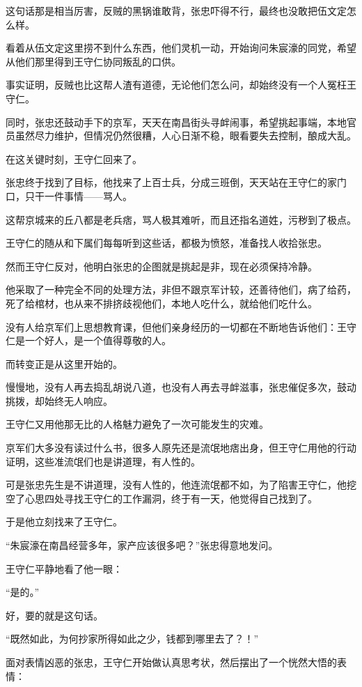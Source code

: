 \begin{multicols}{\theparacolNo}
这句话那是相当厉害，反贼的黑锅谁敢背，张忠吓得不行，最终也没敢把伍文定怎么样。

看着从伍文定这里捞不到什么东西，他们灵机一动，开始询问朱宸濠的同党，希望从他们那里得到王守仁协同叛乱的口供。

事实证明，反贼也比这帮人渣有道德，无论他们怎么问，却始终没有一个人冤枉王守仁。

同时，张忠还鼓动手下的京军，天天在南昌街头寻衅闹事，希望挑起事端，本地官员虽然尽力维护，但情况仍然很糟，人心日渐不稳，眼看要失去控制，酿成大乱。

在这关键时刻，王守仁回来了。

张忠终于找到了目标，他找来了上百士兵，分成三班倒，天天站在王守仁的家门口，只干一件事情——骂人。

这帮京城来的丘八都是老兵痞，骂人极其难听，而且还指名道姓，污秽到了极点。

王守仁的随从和下属们每每听到这些话，都极为愤怒，准备找人收拾张忠。

然而王守仁反对，他明白张忠的企图就是挑起是非，现在必须保持冷静。

他采取了一种完全不同的处理方法，非但不跟京军计较，还善待他们，病了给药，死了给棺材，也从来不排挤歧视他们，本地人吃什么，就给他们吃什么。

没有人给京军们上思想教育课，但他们亲身经历的一切都在不断地告诉他们：王守仁是一个好人，是一个值得尊敬的人。

而转变正是从这里开始的。

慢慢地，没有人再去捣乱胡说八道，也没有人再去寻衅滋事，张忠催促多次，鼓动挑拨，却始终无人响应。

王守仁又用他那无比的人格魅力避免了一次可能发生的灾难。

京军们大多没有读过什么书，很多人原先还是流氓地痞出身，但王守仁用他的行动证明，这些准流氓们也是讲道理，有人性的。

可是张忠先生是不讲道理，没有人性的，他连流氓都不如，为了陷害王守仁，他挖空了心思四处寻找王守仁的工作漏洞，终于有一天，他觉得自己找到了。

于是他立刻找来了王守仁。

“朱宸濠在南昌经营多年，家产应该很多吧？”张忠得意地发问。

王守仁平静地看了他一眼：

“是的。”

好，要的就是这句话。

“既然如此，为何抄家所得如此之少，钱都到哪里去了？！”

面对表情凶恶的张忠，王守仁开始做认真思考状，然后摆出了一个恍然大悟的表情：


\end{multicols}
